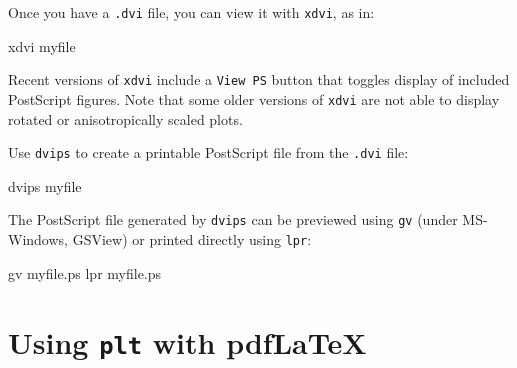 \documentclass{book}
\begin{document}
Once you have a {\tt .dvi} file, you can view it with {\tt xdvi}, as in:
\begin{center}
\begin{boxedverbatim}
xdvi myfile
\end{boxedverbatim}
\end{center}
Recent versions of {\tt xdvi} include a {\tt View PS} button that toggles
display of included PostScript figures.  Note that some older versions
of {\tt xdvi} are not able to display rotated or anisotropically scaled
plots.

Use {\tt dvips} to create a printable PostScript file from the {\tt .dvi}
file:
\begin{center}
\begin{boxedverbatim}
dvips myfile
\end{boxedverbatim}
\end{center}

The PostScript file generated by {\tt dvips} can be previewed using
{\tt gv} (under MS-Windows, GSView) or printed directly using {\tt lpr}:
\begin{center}
\begin{boxedverbatim}
gv myfile.ps
lpr myfile.ps
\end{boxedverbatim}
\end{center}
%


\section{Using {\tt plt} with pdf\LaTeX{}}
\end{document}
